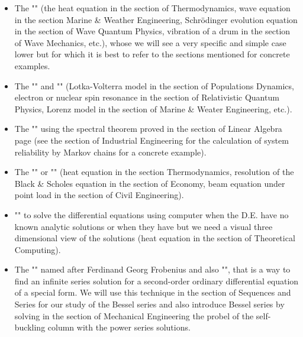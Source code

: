 	\begin{itemize}
		\item The "" (the heat equation in the section of Thermodynamics, wave equation in the section Marine \& Weather Engineering, Schrödinger evolution equation in the section of Wave Quantum Physics, vibration of a drum in the section of Wave Mechanics, etc.), whose we will see a very specific and simple case lower but for which it is best to refer to the sections mentioned for concrete examples.
		
		\item The "" and "" (Lotka-Volterra model in the section of Populations Dynamics, electron or nuclear spin resonance in the section of Relativistic Quantum Physics, Lorenz model in the section of Marine \& Weater Engineering, etc.).
		
		\item The "" using the spectral theorem proved in the section of Linear Algebra page \pageref{spectral theorem} (see the section of Industrial Engineering for the calculation of system reliability by Markov chains for a concrete example).
		
		\item The "" or "" (heat equation in the section Thermodynamics, resolution of the Black \& Scholes equation in the section of Economy, beam equation  under point load in the section of Civil Engineering).
		
		\item "" to solve the differential equations using computer when the D.E. have no known analytic solutions or when they have but we need a visual three dimensional view of the solutions (heat equation in the section of Theoretical Computing).
		
		\item The "" named after Ferdinand Georg Frobenius and  also "", that is a way to find an infinite series solution for a second-order ordinary differential equation of a special form. We will use this technique in the section of Sequences and Series for our study of the Bessel series and also introduce Bessel series by solving in the section of Mechanical Engineering the probel of the self-buckling column with the power series solutions.
	\end{itemize}
